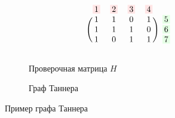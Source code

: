 \begin{figure}[h!]
\centering
\begin{subfigure}{.3\textwidth}
  \centering
  \[
    \begin{blockarray}{ccccc}
        \colorBox{red}{1} & \colorBox{red}{2} & \colorBox{red}{3} & \colorBox{red}{4} \\
        \begin{block}{(cccc)c}
            1&1&0&1&\colorBox{green}{5}\\
            1&1&1&0&\colorBox{green}{6}\\
            1&0&1&1&\colorBox{green}{7} \\
        \end{block}
    \end{blockarray}
  \]
  \caption{Проверочная матрица $H$}
  \label{checkMatrix}
\end{subfigure}%
\begin{subfigure}{.7\textwidth}
  \centering
  \caption{Граф Таннера}
  \label{checkMatrix}
\end{subfigure}
\caption{Пример графа Таннера}
\end{figure}






















































